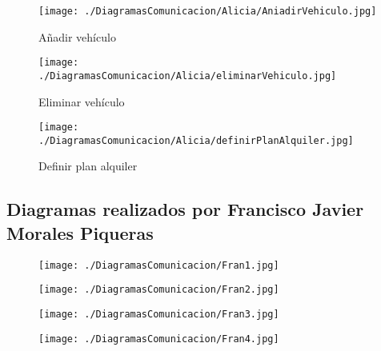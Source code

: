 \documentclass[11pt,spanish]{article} %
\begin{document}
\begin{figure}[H]
	\texttt{[image: ./DiagramasComunicacion/Alicia/AniadirVehiculo.jpg]}
	\caption{Añadir vehículo}
\end{figure}

\begin{figure}[H]
	\texttt{[image: ./DiagramasComunicacion/Alicia/eliminarVehiculo.jpg]}
	\caption{Eliminar vehículo}
\end{figure}

\begin{figure}[H]
	\texttt{[image: ./DiagramasComunicacion/Alicia/definirPlanAlquiler.jpg]}
	\caption{Definir plan alquiler}
\end{figure}
\newpage




\subsection{Diagramas realizados por Francisco Javier Morales Piqueras}
\begin{figure}[H]
	\texttt{[image: ./DiagramasComunicacion/Fran1.jpg]}
	\caption{}
\end{figure}

\begin{figure}[H]
	\texttt{[image: ./DiagramasComunicacion/Fran2.jpg]}
	\caption{}
\end{figure}

\begin{figure}[H]
	\texttt{[image: ./DiagramasComunicacion/Fran3.jpg]}
	\caption{}
\end{figure}

\begin{figure}[H]
	\texttt{[image: ./DiagramasComunicacion/Fran4.jpg]}
	\caption{}
\end{figure}
\newpage

\begin{comment}
\subsection{Diagramas realizados por Samia Mikou}
\begin{figure}[H]
	\texttt{[image: ./DiagramasComunicacion/]}
	\caption{altaRegistro}
\end{figure}

\begin{figure}[H]
	\texttt{[image: ./DiagramasComunicacion/]}
	\caption{altaRegistro}
\end{figure}

\begin{figure}[H]
	\texttt{[image: ./DiagramasComunicacion/]}
	\caption{altaRegistro}
\end{figure}

\begin{figure}[H]
	\texttt{[image: ./DiagramasComunicacion/]}
	\caption{altaRegistro}
\end{figure}
\newpage
\end{comment}
\end{document}
